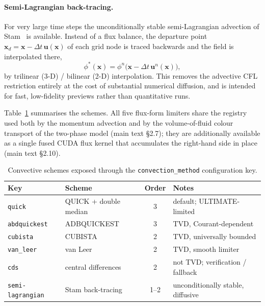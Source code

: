 \documentclass[10pt,onecolumn]{article}
\begin{document}
\paragraph{Semi-Lagrangian back-tracing.}
For very large time steps the unconditionally stable semi-Lagrangian
advection of Stam~\cite{stam1999stable} is available.  Instead of a flux
balance, the departure point $\mathbf x_d = \mathbf x - \Delta t\,
\mathbf u(\mathbf x)$ of each grid node is traced backwards and the field
is interpolated there,
\begin{equation}
  \phi^{*}(\mathbf x) = \phi^{n}\!\bigl(\mathbf x - \Delta t\,
  \mathbf u^{n}(\mathbf x)\bigr),
  \label{eq:s-semilag}
\end{equation}
by trilinear (3-D) / bilinear (2-D) interpolation.  This removes the
advective CFL restriction entirely at the cost of substantial numerical
diffusion, and is intended for fast, low-fidelity previews rather than
quantitative runs.

\medskip
Table~\ref{tab:s-advection} summarises the schemes.  All five flux-form
limiters share the registry used both by the momentum advection and by
the volume-of-fluid colour transport of the two-phase model
(main text \S2.7); they are additionally available as a single fused
CUDA flux kernel that accumulates the right-hand side in place
(main text \S2.10).

\begin{table}[t]
\centering
\caption{Convective schemes exposed through the
\texttt{convection\_method} configuration key.}
\label{tab:s-advection}
\begin{tabular}{@{}l l c l@{}}
\toprule
Key & Scheme & Order & Notes\\
\midrule
\texttt{quick}        & QUICK + double median   & 3 & default; ULTIMATE-limited \\
\texttt{abdquickest}  & ADBQUICKEST             & 3 & TVD, Courant-dependent \\
\texttt{cubista}      & CUBISTA                 & 2 & TVD, universally bounded \\
\texttt{van\_leer}    & van Leer                & 2 & TVD, smooth limiter \\
\texttt{cds}          & central differences     & 2 & not TVD; verification / fallback \\
\texttt{semi-lagrangian} & Stam back-tracing    & 1--2 & unconditionally stable, diffusive \\
\bottomrule
\end{tabular}
\end{table}
\end{document}

